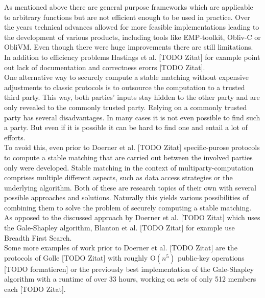 As mentioned above there are general purpose frameworks which are applicable to arbitrary functions but are not efficient enough to be used in practice. Over the years technical advances allowed for more feasible implementations leading to the development of various products, including tools like EMP-toolkit, Obliv-C or ObliVM. Even though there were huge improvements there are still limitations. In addition to efficiency problems Hastings et al. [TODO Zitat] for example point out lack of documentation and correctness erorrs [TODO Zitat]. \\
One alternative way to securely compute a stable matching without expensive adjustments to classic protocols is to outsource the computation to a trusted third party. This way, both parties' inputs stay hidden to the other party and are only revealed to the commonly trusted party.
Relying on a commonly trusted party has several disadvantages. In many cases it is not even possible to find such a party. But even if it is possible it can be hard to find one and entail a lot of efforts. \\
To avoid this, even prior to Doerner et al. [TODO Zitat] specific-purose protocols to compute a stable matching that are carried out between the involved parties only were developed. Stable matching in the context of multiparty-computation comprises multiple different aspects, such as data access strategies or the underlying algorithm. Both of these are research topics of their own with several possible approaches and solutions. Naturally this yields various possibilities of combining them to solve the problem of securely computing a stable matching. As opposed to the discussed approach by Doerner et al. [TODO Zitat] which uses the Gale-Shapley algorithm, Blanton et al. [TODO Zitat] for example use Breadth First Search. \\
Some more examples of work prior to Doerner et al. [TODO Zitat] are the protocols of Golle [TODO Zitat] with roughly O$(n^5)$ public-key operations [TODO formatieren] or the previously best implementation of the Gale-Shapley algorithm with a runtime of over 33 hours, working on sets of only 512 members each [TODO Zitat].